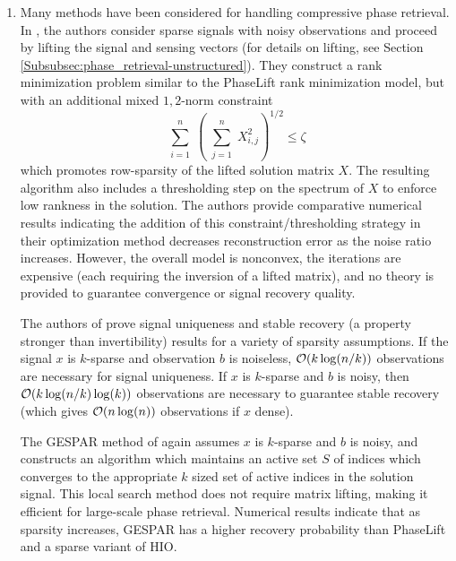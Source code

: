 \begin{enumerate}


\item
Many methods have been considered for handling compressive phase retrieval.  In \cite{DBLP:journals/corr/abs-1104-4406}, the authors consider sparse signals with noisy observations and proceed by lifting the signal and sensing vectors (for details on lifting, see Section \ref{Subsubsec:phase_retrieval-unstructured}).  They construct a rank minimization problem similar to the PhaseLift rank minimization model, but with an additional mixed $1,2$-norm constraint
\[
	\sum\limits_{\substack{i = 1}}^{\substack{n}}
	\left( 	\sum\limits_{\substack{j = 1}}^{\substack{n}}  X_{i, j}^2
	\right)^{1/2}
	\leq \zeta
\]
which promotes row-sparsity of the lifted solution matrix $X$.  The resulting algorithm also includes a thresholding step on the spectrum of $X$ to enforce low rankness in the solution.   The authors provide comparative numerical results indicating the addition of this constraint/thresholding strategy in their optimization method decreases reconstruction error as the noise ratio increases.  However, the overall model is nonconvex, the iterations are expensive (each requiring the inversion of a lifted matrix), and no theory is provided to guarantee convergence or signal recovery quality.

The authors of \cite{DBLP:journals/corr/abs-1211-0872} prove signal uniqueness and stable recovery (a property stronger than invertibility) results for a variety of sparsity assumptions.  If the signal $x$ is $k$-sparse and observation $b$ is noiseless, ${\mathcal O}(k \log(n/k))$ observations are necessary for signal uniqueness.  If $x$ is $k$-sparse and $b$ is noisy, then ${\mathcal O}(k \log(n/k) \log(k))$ observations are necessary to guarantee stable recovery (which gives ${\mathcal O}(n \log(n))$ observations if $x$ dense).

The GESPAR method of \cite{shechtman2014gespar} again assumes $x$ is $k$-sparse and $b$ is noisy, and constructs an algorithm which maintains an active set $S$ of indices which converges to the appropriate $k$ sized set of active indices in the solution signal.  This local search method does not require matrix lifting, making it efficient for large-scale phase retrieval.  Numerical results \cite[Section 5]{shechtman2014gespar} indicate that as sparsity increases, GESPAR has a higher recovery probability than PhaseLift and a sparse variant of HIO.


\end{enumerate}
